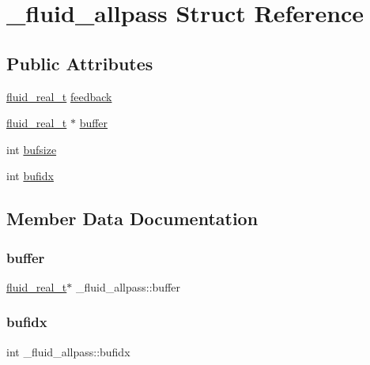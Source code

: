 \hypertarget{struct__fluid__allpass}{}\section{\+\_\+fluid\+\_\+allpass Struct Reference}
\label{struct__fluid__allpass}
\subsection*{Public Attributes}
\begin{DoxyCompactItemize}
\item 
\hyperlink{fluidsynth__priv_8h_a9e96f0917747b69cabb7c671bc693dbb}{fluid\+\_\+real\+\_\+t} \hyperlink{struct__fluid__allpass_aa8d930d5f1a494a6a706549e89838521}{feedback}
\item 
\hyperlink{fluidsynth__priv_8h_a9e96f0917747b69cabb7c671bc693dbb}{fluid\+\_\+real\+\_\+t} $\ast$ \hyperlink{struct__fluid__allpass_ad6c3b8d24e7e5d2e0040073a9b96830c}{buffer}
\item 
int \hyperlink{struct__fluid__allpass_afb12081fc279dc74ec419e1595a67a2d}{bufsize}
\item 
int \hyperlink{struct__fluid__allpass_a3ccf530e0e86318d5842c52d6c693b3a}{bufidx}
\end{DoxyCompactItemize}


\subsection{Member Data Documentation}
\mbox{\label{struct__fluid__allpass_ad6c3b8d24e7e5d2e0040073a9b96830c}} 
\subsubsection{\texorpdfstring{buffer}{buffer}}
{\footnotesize\ttfamily \hyperlink{fluidsynth__priv_8h_a9e96f0917747b69cabb7c671bc693dbb}{fluid\+\_\+real\+\_\+t}$\ast$ \+\_\+fluid\+\_\+allpass\+::buffer}

\mbox{\label{struct__fluid__allpass_a3ccf530e0e86318d5842c52d6c693b3a}} 
\subsubsection{\texorpdfstring{bufidx}{bufidx}}
{\footnotesize\ttfamily int \+\_\+fluid\+\_\+allpass\+::bufidx}


